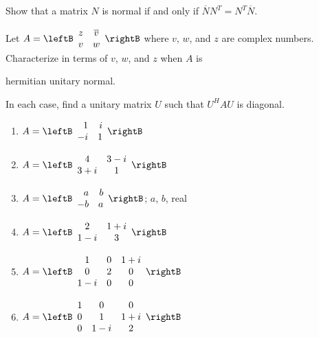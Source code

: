 \begin{multicols}{2}
\begin{ex}
Show that a matrix $N$ is normal if and only if $\overline{N}N^T = N^T\overline{N}$.
\end{ex}

\begin{ex}
Let $A = \leftB \begin{array}{cc}
z & \overline{v} \\
v & w
\end{array}\rightB$
 where $v$, $w$, and $z$ are complex numbers. Characterize in terms of $v$, $w$, and $z$ when $A$ is

\begin{exenumerate}
\exitem hermitian
\exitem unitary
\exitem normal.
\end{exenumerate}
\end{ex}

\begin{ex}
In each case, find a unitary matrix $U$ such that $U^{H}AU$ is diagonal.


\begin{enumerate}[label={\alph*.}]
\item $A = \leftB \begin{array}{rr}
1 & i\\
-i & 1
\end{array}\rightB$

\item $A = \leftB \begin{array}{cc}
4 & 3 - i \\
3 + i & 1
\end{array}\rightB$

\item $A = \leftB \begin{array}{rr}
a & b\\
-b & a
\end{array}\rightB$;  $a$, $b$, real 

\item $A = \leftB \begin{array}{cc}
2 & 1 + i\\
1 - i & 3
\end{array}\rightB$

\item $A = \leftB \begin{array}{ccc}
1 & 0 &  1 + i\\
0 & 2 & 0 \\
1 - i & 0 & 0
\end{array}\rightB$

\item $A = \leftB \begin{array}{ccc}
1 & 0 & 0\\
0 & 1 & 1 + i\\
0 & 1 - i & 2
\end{array}\rightB$


\end{enumerate}
\end{ex}
\end{multicols}
